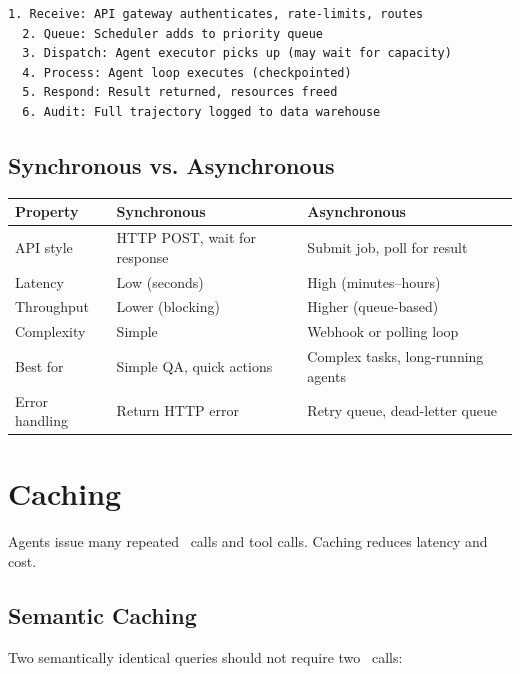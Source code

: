 \begin{lstlisting}[caption=Production request flow]
  1. Receive: API gateway authenticates, rate-limits, routes
  2. Queue: Scheduler adds to priority queue
  3. Dispatch: Agent executor picks up (may wait for capacity)
  4. Process: Agent loop executes (checkpointed)
  5. Respond: Result returned, resources freed
  6. Audit: Full trajectory logged to data warehouse
\end{lstlisting}

\subsection{Synchronous vs. Asynchronous}

\begin{longtable}{p{3cm}p{5cm}p{5cm}}
	\toprule
	\textbf{Property} & \textbf{Synchronous}         & \textbf{Asynchronous}              \\
	\midrule
	API style         & HTTP POST, wait for response & Submit job, poll for result        \\
	Latency           & Low (seconds)                & High (minutes--hours)              \\
	Throughput        & Lower (blocking)             & Higher (queue-based)               \\
	Complexity        & Simple                       & Webhook or polling loop            \\
	Best for          & Simple QA, quick actions     & Complex tasks, long-running agents \\
	Error handling    & Return HTTP error            & Retry queue, dead-letter queue     \\
	\bottomrule
\end{longtable}

\section{Caching}

Agents issue many repeated \llm\ calls and tool calls. Caching reduces latency and cost.

\subsection{Semantic Caching}

Two semantically identical queries should not require two \llm\ calls:

